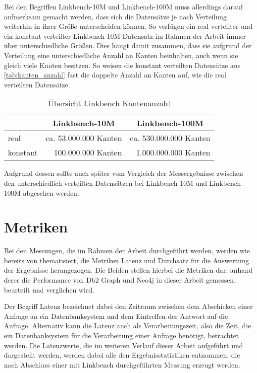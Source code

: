 Bei den Begriffen Linkbench-10M und Linkbench-100M muss allerdings darauf aufmerksam gemacht werden, dass sich die Datensätze je nach Verteilung weiterhin in ihrer Größe unterscheiden können. So verfügen ein real verteilter und ein konstant verteilter Linkbench-10M Datensatz im Rahmen der Arbeit immer über unterschiedliche Größen. Dies hängt damit zusammen, dass sie aufgrund der Verteilung eine unterschiedliche Anzahl an Kanten beinhalten, auch wenn sie gleich viele Knoten besitzen. So weisen die konstant verteilten Datensätze aus \autoref{tab:kanten_anzahl} fast die doppelte Anzahl an Kanten auf, wie die real verteilten Datensätze. 

\begin{table}[ht]
    \centering
    \begin{tabular}{l|r|r}
    \hline
    \rowcolor[HTML]{EFEFEF} 
    \multicolumn{1}{c|}{\cellcolor[HTML]{EFEFEF}\textbf{Verteilung}} & \multicolumn{1}{c|}{\cellcolor[HTML]{EFEFEF}\textbf{Linkbench-10M}} & \multicolumn{1}{c}{\cellcolor[HTML]{EFEFEF}\textbf{Linkbench-100M}} \\ \hline
    real & ca. 53.000.000 Kanten & ca. 530.000.000 Kanten \\
    konstant & 100.000.000 Kanten & 1.000.000.000 Kanten \\ \hline
    \end{tabular}
    \caption{Übersicht Linkbench Kantenanzahl}
    \label{tab:kanten_anzahl}
\end{table}

Aufgrund dessen sollte auch später vom Vergleich der Messergebnisse zwischen den unterschiedlich verteilten Datensätzen bei Linkbench-10M und Linkbench-100M abgesehen werden.

\section{Metriken}
\label{analyse:metriken}
Bei den Messungen, die im Rahmen der Arbeit durchgeführt werden, werden wie bereits von  thematisiert, die Metriken Latenz und Durchsatz für die Auswertung der Ergebnisse herangezogen. Die Beiden stellen hierbei die Metriken dar, anhand derer die Performance von Db2 Graph und Neo4j in dieser Arbeit gemessen, beurteilt und verglichen wird.

Der Begriff Latenz bezeichnet dabei den Zeitraum zwischen dem Abschicken einer Anfrage an ein Datenbanksystem und dem Eintreffen der Antwort auf die Anfrage. Alternativ kann die Latenz auch als Verarbeitungszeit, also die Zeit, die ein Datenbanksystem für die Verarbeitung einer Anfrage benötigt, betrachtet werden. Die Latenzwerte, die im weiteren Verlauf dieser Arbeit aufgeführt und dargestellt werden, werden dabei alle den Ergebnisstatistiken entnommen, die nach Abschluss einer mit Linkbench durchgeführten Messung erzeugt werden. 

